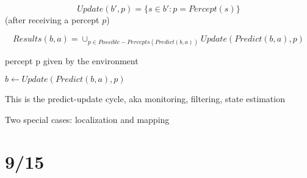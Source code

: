 \documentclass[12pt]{article}
\begin{document}
$$Update(b', p) = \{s \in b' : p = Percept(s)\}$$ (after receiving a percept $p$)

$$Results(b, a) = \cup_{p \in Possible-Percepts(Predict(b, a))}Update(Predict(b, a), p)$$

percept p given by the environment

\noindent
$b \leftarrow Update(Predict(b, a), p)$

This is the predict-update cycle, aka monitoring, filtering, state estimation

Two special cases: localization and mapping

\section{9/15}
\end{document}
